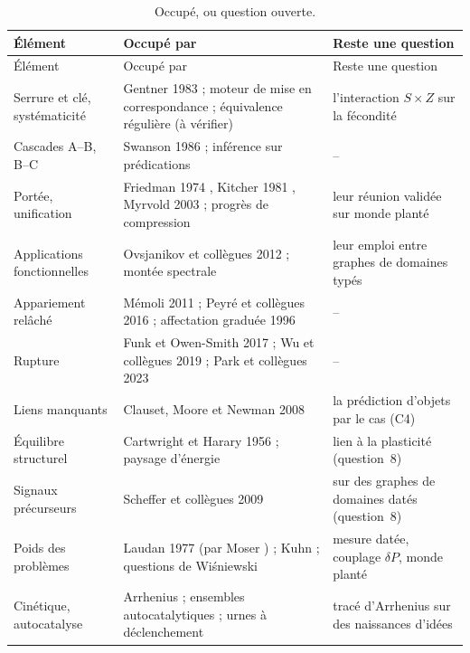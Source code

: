 \documentclass[11pt,a4paper]{article}
\theoremstyle{definition}
\theoremstyle{plain}
\begin{document}
\begin{longtable}{@{}p{}p{}p{}@{}}
\caption{Occupé, ou question ouverte.}\label{tab:neuf}\\
\toprule
Élément & Occupé par & Reste une question \\
\midrule
\endfirsthead
\toprule
Élément & Occupé par & Reste une question \\
\midrule
\endhead
Serrure et clé, systématicité & Gentner 1983 \cite{gentner1983} ; moteur de mise en correspondance \cite{falkenhainer1989} ; équivalence régulière (à vérifier) & l'interaction $S\times Z$ sur la fécondité \\
Cascades A--B, B--C & Swanson 1986 \cite{swanson1986} ; inférence sur prédications \cite{cohen2012} & -- \\
Portée, unification & Friedman 1974 \cite{friedman1974}, Kitcher 1981 \cite{kitcher1981}, Myrvold 2003 \cite{myrvold2003} ; progrès de compression \cite{schmidhuber2010} & leur réunion validée sur monde planté \\
Applications fonctionnelles & Ovsjanikov et collègues 2012 \cite{ovsjanikov2012} ; montée spectrale \cite{melzi2019} & leur emploi entre graphes de domaines typés \\
Appariement relâché & Mémoli 2011 \cite{memoli2011} ; Peyré et collègues 2016 \cite{peyre2016} ; affectation graduée 1996 \cite{goldrangarajan1996} & -- \\
Rupture & Funk et Owen-Smith 2017 \cite{funk2017} ; Wu et collègues 2019 \cite{wu2019} ; Park et collègues 2023 \cite{park2023} & -- \\
Liens manquants & Clauset, Moore et Newman 2008 \cite{clauset2008} & la prédiction d'objets par le cas (C4) \\
Équilibre structurel & Cartwright et Harary 1956 \cite{cartwright1956} ; paysage d'énergie \cite{marvel2009} & lien à la plasticité (question~8) \\
Signaux précurseurs & Scheffer et collègues 2009 \cite{scheffer2009} & sur des graphes de domaines datés (question~8) \\
Poids des problèmes & Laudan 1977 (par Moser \cite{moser1991}) ; Kuhn \cite{kuhn1962} ; questions de Wiśniewski \cite{wisniewski2001} & mesure datée, couplage $\delta P$, monde planté \\
Cinétique, autocatalyse & Arrhenius \cite{arrhenius1889} ; ensembles autocatalytiques \cite{hordijk2004} ; urnes à déclenchement \cite{tria2014} & tracé d'Arrhenius sur des naissances d'idées \\

\end{longtable}
\end{document}
